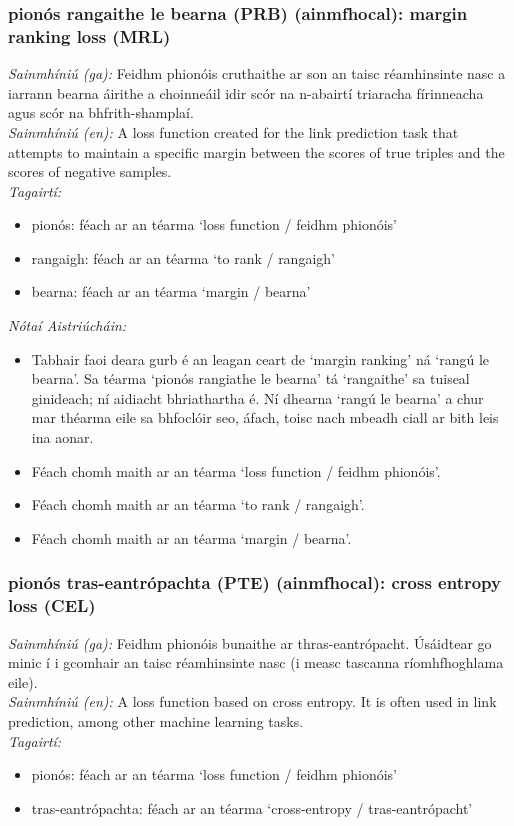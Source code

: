 \documentclass{article}
\begin{document}
\subsubsection*{pionós rangaithe le bearna (PRB) (ainmfhocal): margin ranking loss (MRL)}
 \noindent \textit{Sainmhíniú (ga):} Feidhm phionóis cruthaithe ar son an taisc réamhinsinte nasc a iarrann bearna áirithe a choinneáil idir scór na n-abairtí triaracha fírinneacha agus scór na bhfrith-shamplaí.
\\
 \noindent \textit{Sainmhíniú (en):} A loss function created for the link prediction task that attempts to maintain a specific margin between the scores of true triples and the scores of negative samples.
\\
 \noindent \textit{Tagairtí:}
\begin{itemize}
	\item pionós: féach ar an téarma `loss function / feidhm phionóis'
	\item rangaigh: féach ar an téarma `to rank / rangaigh'
	\item bearna: féach ar an téarma `margin / bearna'
\end{itemize}

 \noindent \textit{Nótaí Aistriúcháin:}
\begin{itemize}
	\item Tabhair faoi deara gurb é an leagan ceart de `margin ranking' ná `rangú le bearna'. Sa téarma `pionós rangiathe le bearna' tá `rangaithe' sa tuiseal ginideach; ní aidiacht bhriathartha é. Ní dhearna `rangú le bearna' a chur mar théarma eile sa bhfoclóir seo, áfach, toisc nach mbeadh ciall ar bith leis ina aonar.
	\item Féach chomh maith ar an téarma `loss function / feidhm phionóis'.
	\item Féach chomh maith ar an téarma `to rank / rangaigh'.
	\item Féach chomh maith ar an téarma `margin / bearna'.
\end{itemize}


\subsubsection*{pionós tras-eantrópachta (PTE) (ainmfhocal): cross entropy loss (CEL)}
 \noindent \textit{Sainmhíniú (ga):} Feidhm phionóis bunaithe ar thras-eantrópacht. Úsáidtear go minic í i gcomhair an taisc réamhinsinte nasc (i measc tascanna ríomhfhoghlama eile).
\\
 \noindent \textit{Sainmhíniú (en):} A loss function based on cross entropy. It is often used in link prediction, among other machine learning tasks.
\\
 \noindent \textit{Tagairtí:}
\begin{itemize}
	\item pionós: féach ar an téarma `loss function / feidhm phionóis'
	\item tras-eantrópachta: féach ar an téarma `cross-entropy / tras-eantrópacht'
\end{itemize}
\end{document}
